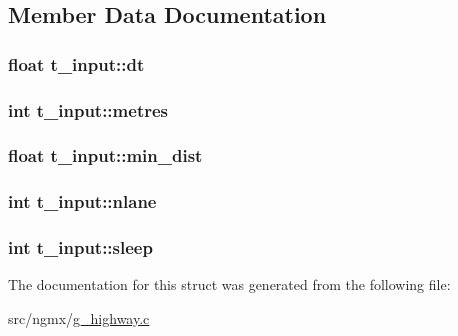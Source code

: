 \subsection{\-Member \-Data \-Documentation}
\hypertarget{structt__input_a65c0eaa1d49176526166daee469965ef}{
\subsubsection[{dt}]{\setlength{\rightskip}{0pt plus 5cm}float {\bf t\-\_\-input\-::dt}}}\label{structt__input_a65c0eaa1d49176526166daee469965ef}
\hypertarget{structt__input_ad8a619bcac130645907c8d96501706e0}{
\subsubsection[{metres}]{\setlength{\rightskip}{0pt plus 5cm}int {\bf t\-\_\-input\-::metres}}}\label{structt__input_ad8a619bcac130645907c8d96501706e0}
\hypertarget{structt__input_a57670cdbdff458ca01c55df3c53d9f39}{
\subsubsection[{min\-\_\-dist}]{\setlength{\rightskip}{0pt plus 5cm}float {\bf t\-\_\-input\-::min\-\_\-dist}}}\label{structt__input_a57670cdbdff458ca01c55df3c53d9f39}
\hypertarget{structt__input_a5eaf0211f0b1426e62599a05ed59fdad}{
\subsubsection[{nlane}]{\setlength{\rightskip}{0pt plus 5cm}int {\bf t\-\_\-input\-::nlane}}}\label{structt__input_a5eaf0211f0b1426e62599a05ed59fdad}
\hypertarget{structt__input_a12067219b44a45f4ad1a86cce07fc92f}{
\subsubsection[{sleep}]{\setlength{\rightskip}{0pt plus 5cm}int {\bf t\-\_\-input\-::sleep}}}\label{structt__input_a12067219b44a45f4ad1a86cce07fc92f}


\-The documentation for this struct was generated from the following file\-:\begin{DoxyCompactItemize}
\item 
src/ngmx/\hyperlink{g__highway_8c}{g\-\_\-highway.\-c}\end{DoxyCompactItemize}
